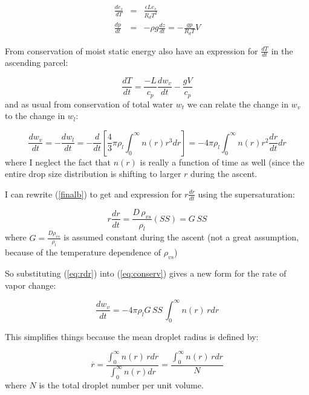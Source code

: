 \documentclass[12pt]{article}
\begin{document}
\begin{subequations}
  \begin{eqnarray}
    \label{eq:various}
    \frac{de_s}{dT} &=& \frac{\epsilon L e_s}{R_d T^2}\\
    \frac{dp}{dt} & = & - \rho g \frac{dz}{dt} = -\frac{g p}{R_d T} V
  \end{eqnarray}
\end{subequations}

From conservation of moist static energy also have an expression for $\frac{dT}{dt}$ in the ascending parcel:

\begin{equation}
  \label{eq:adia}
  \frac{dT}{dt} = \frac{-L}{c_p} \frac{dw_v}{dt} - \frac{g V}{c_p}
\end{equation}
and as usual from conservation of total water $w_t$ we can relate the change in $w_v$ to the change
in $w_l$:

\begin{equation}
  \label{eq:conserv}
  \frac{d w_v}{dt} = - \frac{d w_l}{dt} = - \frac{d}{dt} \left [ \frac{4}{3} \pi \rho_l
  \int_0^\infty n(r) r^3 dr \right ] = -4 \pi \rho_l \int_0^\infty n(r) r^2 \frac{dr}{dt} dr
\end{equation}
where I neglect the fact that $n(r)$ is really a function of time as well (since the entire
drop size distribution is shifting to larger $r$ during the ascent.

I can rewrite (\ref{finalb}) to get and expression for $r \frac{dr}{dt}$ using the supersaturation:

\begin{equation}
  \label{eq:rdr}
  r \frac{dr}{dt} = \frac{D\,\rho_{v s}}{ \rho_l }(SS) = G\,SS
\end{equation}
where $G=\frac{D  \rho_{v s}}{ \rho_l}$ is assumed constant during the ascent
(not a great assumption, because of the temperature dependence of $\rho_{v s}$)

So substituting (\ref{eq:rdr}) into (\ref{eq:conserv}) gives a new form for the rate of vapor change:

\begin{equation}
  \label{eq:newvap}
    \frac{d w_v}{dt} = - 4 \pi \rho_l G\, SS\, \int_0^\infty n(r) \, r dr
\end{equation}

This simplifies things because the mean droplet radius is defined by:

\begin{equation}
  \label{eq:mean}
\overline{r} = \frac{\int_0^\infty n(r) \, r dr}{\int_0^\infty n(r)  dr} = 
\frac{\int_0^\infty n(r) \, r dr}{N}
\end{equation}
where $N$ is the total droplet number per unit volume.
\end{document}
